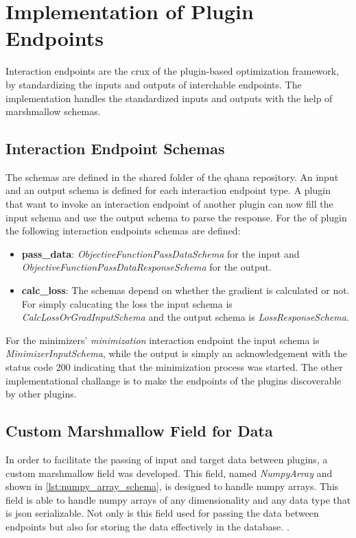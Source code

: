 \documentclass[
  a4paper,  %
  twoside,  %
  bibliography=totoc,
  headsepline,
  cleardoublepage=empty,
  parskip=half,
  draft=false
]{scrbook}
\begin{document}
\section{Implementation of Plugin Endpoints}
\label{sec:implementationOfInteractionEndpoints}

Interaction endpoints are the crux of the plugin-based optimization framework, by standardizing the inputs and outputs of interchable endpoints.
The implementation handles the standardized inputs and outputs with the help of marshmallow schemas.

\subsection{Interaction Endpoint Schemas}
The schemas are defined in the shared folder of the \gls{qhana} repository.
An input and an output schema is defined for each interaction endpoint type.
A plugin that want to invoke an interaction endpoint of another plugin can now fill the input schema and use the output schema to parse the response.
For the \gls{of} plugin the following interaction endpoints schemas are defined:
\begin{itemize}
  \item \textbf{pass\_data}: \emph{ObjectiveFunctionPassDataSchema} for the input and \emph{ObjectiveFunctionPassDataResponseSchema} for the output.
  \item \textbf{calc\_loss}: The schemas depend on whether the gradient is calculated or not. For simply calucating the loss the input schema is \emph{CalcLossOrGradInputSchema} and the output schema is \emph{LossResponseSchema}.
\end{itemize}
For the minimizers' \emph{minimization} interaction endpoint the input schema is \emph{MinimizerInputSchema}, while the output is simply an acknowledgement with the status code 200 indicating that the minimization process was started.
The other implementational challange is to make the endpoints of the plugins discoverable by other plugins.

\subsection{Custom Marshmallow Field for Data}
\label{sec:customMarshmallowFieldForData}
In order to facilitate the passing of input and target data between plugins, a custom marshmallow field was developed.
This field, named \emph{NumpyArray} and shown in \ref{lst:numpy_array_schema}, is designed to handle numpy arrays.
This field is able to handle numpy arrays of any dimensionality and any data type that is json serializable.
Not only is this field used for passing the data between endpoints but also for storing the data effectively in the database.
.
\end{document}
